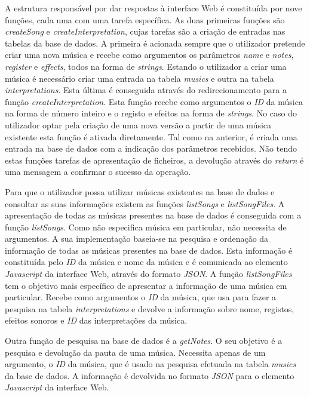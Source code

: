 \documentclass[11pt,openany,twoside]{report}
\begin{document}
A estrutura responsável por dar respostas à interface Web é constituída por nove funções, cada uma com uma tarefa específica. As duas primeiras funções são \textit{createSong} e \textit{createInterpretation}, cujas tarefas são a criação de entradas nas tabelas da base de dados. A primeira é acionada sempre que o utilizador pretende criar uma nova música e recebe como argumentos os parâmetros \textit{name} e \textit{notes}, \textit{register} e \textit{effects}, todos na forma de \textit{strings}. Estando o utilizador a criar uma música é necessário criar uma entrada na tabela \textit{musics} e outra na tabela \textit{interpretations}. Esta última é conseguida através do redirecionamento para a função \textit{createInterpretation}. Esta função recebe como argumentos o \textit{ID} da música na forma de número inteiro e o registo e efeitos na forma de \textit{strings}. No caso do utilizador optar pela criação de uma nova versão a partir de uma música existente esta função é ativada diretamente. Tal como na anterior, é criada uma entrada na base de dados com a indicação dos parâmetros recebidos. Não tendo estas funções tarefas de apresentação de ficheiros, a devolução através do \textit{return} é uma mensagem a confirmar o sucesso da operação.

Para que o utilizador possa utilizar músicas existentes na base de dados e consultar as suas informações existem as funções \textit{listSongs} e \textit{listSongFiles}. A apresentação de todas as músicas presentes na base de dados é conseguida com a função \textit{listSongs}. Como não especifica música em particular, não necessita de argumentos. A sua implementação baseia-se na pesquisa e ordenação da informação de todas as músicas presentes na base de dados. Esta informação é constituída pelo \textit{ID} da música e nome da música e é comunicada ao elemento \textit{Javascript} da interface Web, através do formato \textit{JSON}. A função \textit{listSongFiles} tem o objetivo mais específico de apresentar a informação de uma música em particular. Recebe como argumentos o \textit{ID} da música, que usa para fazer a pesquisa na tabela \textit{interpretations} e devolve a informação sobre nome, registos, efeitos sonoros e \textit{ID} das interpretações da música.

Outra função de pesquisa na base de dados é a \textit{getNotes}. O seu objetivo é a pesquisa e devolução da pauta de uma música. Necessita apenas de um argumento, o \textit{ID} da música, que é usado na pesquisa efetuada na tabela \textit{musics} da base de dados. A informação é devolvida no formato \textit{JSON} para o elemento \textit{Javascript} da interface Web.
\end{document}
